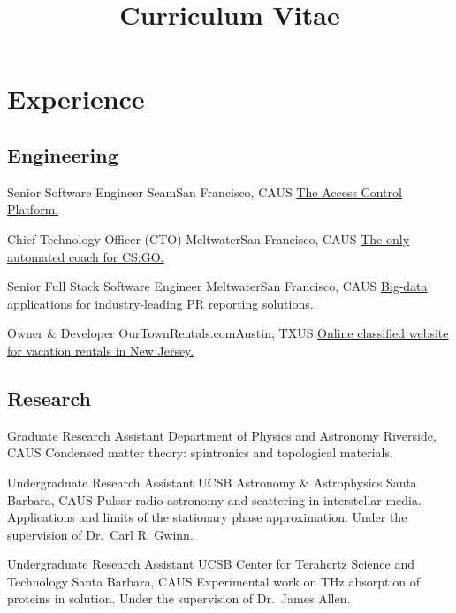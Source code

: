\documentclass[10pt,letter]{moderncv}
\title{Curriculum Vitae}
\begin{document}
  \maketitle

  \section{Experience}

  \subsection{Engineering}

    {Senior Software Engineer}
    {Seam}{San Francisco, CA}{US}
    {\href{https://seam.co}
      {The Access Control Platform.}}

    {Chief Technology Officer (CTO)}
    {Meltwater}{San Francisco, CA}{US}
    {\href{https://pureskill.gg}
      {The only automated coach for CS:GO.}}

    {Senior Full Stack Software Engineer}
    {Meltwater}{San Francisco, CA}{US}
    {\href{https://www.meltwater.com}
      {Big-data applications for industry-leading PR reporting solutions.}}

    {Owner \& Developer}
    {OurTownRentals.com}{Austin, TX}{US}
    {\href{https://ourtownrentals.com}
      {Online classified website for vacation rentals in New Jersey.}}

  \subsection{Research}

    {Graduate Research Assistant}
    {Department of Physics and Astronomy}
    {Riverside, CA}{US}
    {Condensed matter theory: spintronics and topological materials.}

    {Undergraduate Research Assistant}
    {UCSB Astronomy \& Astrophysics}
    {Santa Barbara, CA}{US}
    {Pulsar radio astronomy and scattering in interstellar media.
      Applications and limits of the stationary phase approximation.
      Under the supervision of Dr.~Carl R. Gwinn.}

    {Undergraduate Research Assistant}
    {UCSB Center for Terahertz Science and Technology}
    {Santa Barbara, CA}{US}
    {Experimental work on THz absorption of proteins in solution.
      Under the supervision of Dr.~James Allen.}
\end{document}
